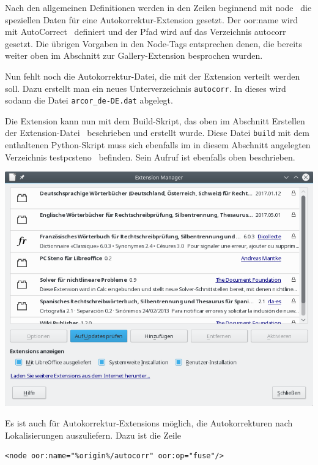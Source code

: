 \documentclass[a4paper,10pt,pagesize,titlepage]{scrbook}
\begin{document}
Nach den allgemeinen Definitionen werden in den Zeilen beginnend mit \glqq node\grqq~ die speziellen Daten für eine Autokorrektur-Extension gesetzt. Der oor:name wird mit \glqq AutoCorrect\grqq~ definiert und der Pfad wird auf das Verzeichnis \glqq autocorr\grqq~ gesetzt. Die übrigen Vorgaben in den Node-Tags entsprechen denen, die bereits weiter oben im Abschnitt zur Gallery-Extension besprochen wurden.

Nun fehlt noch die Autokorrektur-Datei, die mit der Extension verteilt werden soll. Dazu erstellt man ein neues Unterverzeichnis \verb|autocorr|. In dieses wird sodann die Datei \verb|arcor_de-DE.dat| abgelegt.

Die Extension kann nun mit dem Build-Skript, das oben im Abschnitt \glqq Erstellen der Extension-Datei\grqq~ beschrieben und erstellt wurde. Diese Datei \verb|build| mit dem enthaltenen Python-Skript muss sich ebenfalls im in diesem Abschnitt angelegten Verzeichnis \glqq testpcsteno\grqq~ befinden. Sein Aufruf ist ebenfalls oben beschrieben.

\begin{center}
	\captionsetup{type=figure}
	\includegraphics[width=0.9\linewidth]{pics/extensionmanager_autocorrect_extension_installed01}
	\label{fig:autocorr_extension_extension_manager}
\end{center}



Es ist auch für Autokorrektur-Extensions möglich, die Autokorrekturen nach Lokalisierungen auszuliefern. Dazu ist die Zeile
\begin{lstlisting}
<node oor:name="%origin%/autocorr" oor:op="fuse"/>
\end{lstlisting}
\end{document}
